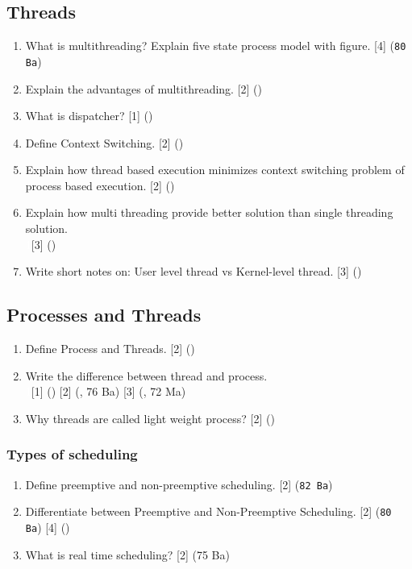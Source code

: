 \documentclass[12pt]{article}
\newcommand{\enter}{\\\textcolor{white}{1}}
\begin{document}
	\subsection{Threads}
		\begin{enumerate}[noitemsep, topsep = 0pt]
			\item What is multithreading? Explain five state process model with figure. \hfill [4] (\texttt{80 Ba})
			
			\item Explain the advantages of multithreading. \hfill [2] ()
			
			\item What is dispatcher? \hfill [1] ()
			
			\item Define Context Switching. \hfill [2] ()
			
			\item Explain how thread based execution minimizes context switching problem of process based execution. \hfill [2] ()
			
			\item Explain how multi threading provide better solution than single threading solution.
			\enter \hfill [3] ()

			\item Write short notes on: User level thread vs Kernel-level thread. \hfill [3] ()
		\end{enumerate}

	\subsection{Processes and Threads}
		\begin{enumerate}[noitemsep, topsep = 0pt]
			\item Define Process and Threads. \hfill [2] ()
			
			\item Write the difference between thread and process. 
			\enter\hfill [1] () [2] (, 76 Ba) [3] (, 72 Ma)
			
			\item Why threads are called light weight process? \hfill [2] ()
		\end{enumerate}

		\subsubsection{Types of scheduling}
			\begin{enumerate}[noitemsep, topsep = 0pt]
				\item Define preemptive and non-preemptive scheduling. \hfill [2] (\texttt{82 Ba})
				
				\item Differentiate between Preemptive and Non-Preemptive Scheduling. \hfill [2] (\texttt{80 Ba}) [4] ()
				
				\item What is real time scheduling? \hfill [2] (75 Ba)
			\end{enumerate}
\end{document}
